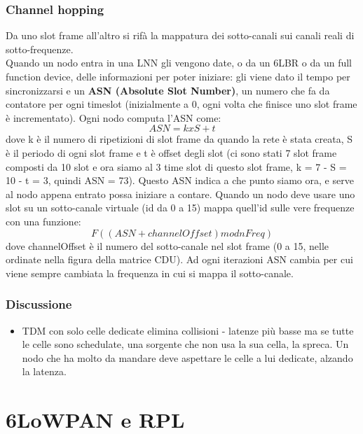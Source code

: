 \documentclass[12pt,italian]{report}
\begin{document}
\subsection{Channel hopping}
 Da uno slot frame all'altro si rifà la mappatura dei sotto-canali sui canali reali di sotto-frequenze. \\ Quando un nodo entra in una LNN gli vengono date, o da un 6LBR o da un full function device, delle informazioni per poter iniziare: gli viene dato il tempo per sincronizzarsi e un \textbf{ASN (Absolute Slot Number)}, un numero che fa da contatore per ogni timeslot (inizialmente a 0, ogni volta che finisce uno slot frame è incrementato). 
 \bigbreak
 Ogni nodo computa l'ASN come:
 \begin{equation}
     ASN = k x S + t
 \end{equation}
 \noindent dove k è il numero di ripetizioni di slot frame da quando la rete è stata creata, S è il periodo di ogni slot frame e t è offset degli slot (ci sono stati 7 slot frame composti da 10 slot e ora siamo al 3 time slot di questo slot frame, k = 7 - S = 10 - t = 3, quindi ASN = 73). Questo ASN indica a che punto siamo ora, e serve al nodo appena entrato possa iniziare a contare. 
 \bigbreak
Quando un nodo deve usare uno slot su un sotto-canale virtuale (id da 0 a 15) mappa quell'id sulle vere frequenze con una funzione:
\begin{equation}
    F((ASN + channelOffset)mod nFreq)
\end{equation}
\noindent dove channelOffset è il numero del sotto-canale nel slot frame (0 a 15, nelle ordinate nella figura della matrice CDU). 
\bigbreak
Ad ogni iterazioni ASN cambia per cui viene sempre cambiata la frequenza in cui si mappa il sotto-canale. 

\subsection{Discussione}
\begin{itemize}
    \item TDM con solo celle dedicate elimina collisioni - latenze più basse ma se tutte le celle sono schedulate, una sorgente che non usa la sua cella, la spreca. Un nodo che ha molto da mandare deve aspettare le celle a lui dedicate, alzando la latenza. 
\end{itemize}

\chapter{6LoWPAN e RPL}
\end{document}
